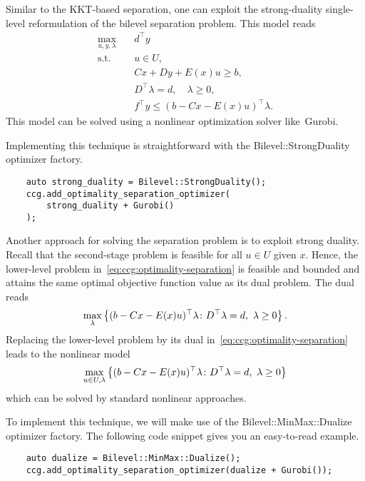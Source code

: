 
Similar to the KKT-based separation, one can exploit the strong-duality
single-level reformulation of the bilevel separation problem. This model reads
\begin{align*}
    \max_{u,y,\lambda} \quad & d^\top y \\
    \text{s.t.} \quad & u\in U, \\
    & Cx + Dy + E(x)u \ge b, \\ 
    & D^\top \lambda = d, \quad \lambda\ge 0, \\
    & f^\top y \le (b - Cx - E(x)u)^\top\lambda.
\end{align*}
%
This model can be solved using a nonlinear optimization solver
like~\textsf{Gurobi}.

Implementing this technique is straightforward with the
\textsf{Bilevel::StrongDuality} optimizer factory.
%
\begin{lstlisting}
    auto strong_duality = Bilevel::StrongDuality();
    ccg.add_optimality_separation_optimizer(
        strong_duality + Gurobi()
    );
\end{lstlisting}


Another approach for solving the separation problem is to exploit strong
duality. Recall that the second-stage problem is feasible for all $u\in U$
given $x$. Hence, the lower-level problem
in~\eqref{eq:ccg:optimality-separation} is feasible and bounded and attains
the same optimal objective function value as its dual problem. The dual reads
\begin{equation*}
    \max_{\lambda} \left\{ (b - Cx - E(x)u)^\top\lambda \colon D^\top \lambda = d, \ \lambda \ge 0 \right\}.
\end{equation*}
Replacing the lower-level problem by its dual
in~\eqref{eq:ccg:optimality-separation} leads to the nonlinear model
\begin{equation}
    \label{eq:ccg:optimality-duality-separation}
    \max_{u\in U, \lambda} \left\{ (b - Cx - E(x)u)^\top\lambda \colon D^\top \lambda = d, \ \lambda \ge 0 \right\}
\end{equation}
which can be solved by standard nonlinear approaches. 

To implement this technique, we will make use of the
\textsf{Bilevel::MinMax::Dualize} optimizer factory. The following code
snippet gives you an easy-to-read example.
%
\begin{lstlisting}
    auto dualize = Bilevel::MinMax::Dualize();
    ccg.add_optimality_separation_optimizer(dualize + Gurobi());
\end{lstlisting}

